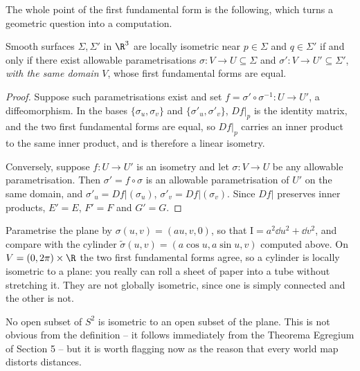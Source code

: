 The whole point of the first fundamental form is the following, which turns a geometric question into a computation.

\begin{lemma}
    Smooth surfaces $\Sigma, \Sigma'$ in $\R^3$ are locally isometric near $p \in \Sigma$ and $q \in \Sigma'$ if and only if there exist allowable parametrisations $\sigma: V \rightarrow U \subseteq \Sigma$ and $\sigma': V \rightarrow U' \subseteq \Sigma'$, \emph{with the same domain} $V$, whose first fundamental forms are equal.
\end{lemma}
\begin{proof}
    Suppose such parametrisations exist and set $f = \sigma' \circ \sigma^{-1}: U \rightarrow U'$, a diffeomorphism. In the bases $\{\sigma_u, \sigma_v\}$ and $\{\sigma'_u, \sigma'_v\}$, $\left.Df\right|_p$ is the identity matrix, and the two first fundamental forms are equal, so $\left.Df\right|_p$ carries an inner product to the same inner product, and is therefore a linear isometry.

    Conversely, suppose $f: U \rightarrow U'$ is an isometry and let $\sigma: V \rightarrow U$ be any allowable parametrisation. Then $\sigma' = f\circ\sigma$ is an allowable parametrisation of $U'$ on the same domain, and $\sigma'_u = \left.Df\right|(\sigma_u)$, $\sigma'_v = \left.Df\right|(\sigma_v)$. Since $\left.Df\right|$ preserves inner products, $E' = E$, $F' = F$ and $G' = G$.
\end{proof}

\begin{example}
    Parametrise the plane by $\sigma(u,v) = (au, v, 0)$, so that $\mathrm{I} = a^2\dd u^2 + \dd v^2$, and compare with the cylinder $\tilde\sigma(u, v) = (a\cos u, a\sin u, v)$ computed above. On $V = (0, 2\pi)\times\R$ the two first fundamental forms agree, so a cylinder is locally isometric to a plane: you really can roll a sheet of paper into a tube without stretching it. They are not globally isometric, since one is simply connected and the other is not.
\end{example}

\begin{example}
    No open subset of $S^2$ is isometric to an open subset of the plane. This is not obvious from the definition -- it follows immediately from the Theorema Egregium of Section 5 -- but it is worth flagging now as the reason that every world map distorts distances.
\end{example}

